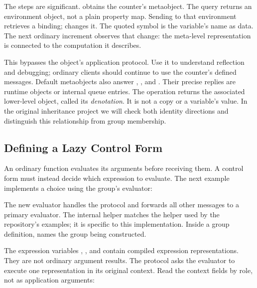 The steps are significant.  obtains the
counter's metaobject. The  query returns an environment
object, not a plain property map. Sending \code{[:value-of 'n]} to that
environment retrieves a binding; \code{[:set 'n 40]} changes it.
The quoted symbol is the variable's name as data.
The next ordinary increment observes that change: the meta-level
representation is connected to the computation it describes.

This bypasses the object's application protocol. Use it to understand
reflection and debugging; ordinary clients should continue to use
the counter's defined messages. Default metaobjects also answer
, , and .
Their precise replies are runtime objects or internal queue entries.
The operation  returns the associated lower-level
object, called its \emph{denotation}. It is not a copy or a variable's
value. In the original inheritance project we will check both identity
directions and distinguish this relationship from group membership.

\subsection{Defining a Lazy Control Form}

An ordinary function evaluates its arguments before receiving them.
A control form must instead decide which expression to evaluate.
The next example implements a choice using the group's evaluator:


The new evaluator handles the  protocol and forwards all
other messages to a primary evaluator. The internal helper
 matches the helper used by the
repository's examples; it is specific to this implementation.
Inside a group definition,  names the group being constructed.

The expression variables , , and 
contain compiled expression representations. They are not ordinary
argument results. The  protocol
asks the evaluator to execute one representation in its original context.
Read the context fields by role, not as application arguments:

